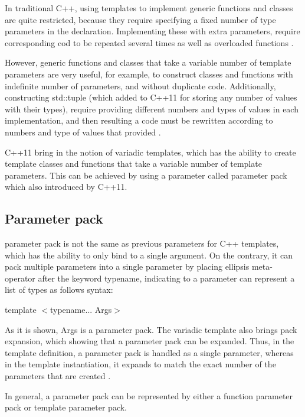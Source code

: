 \documentclass[11pt]{report}
\begin{document}
In traditional C++, using templates to implement generic functions and classes are quite restricted, because they require specifying a fixed number of type parameters in the declaration. Implementing these with extra parameters, require corresponding cod to be repeated several times as well as overloaded functions \cite{Stroustrup:2012:Cpp11}.


However, generic functions and classes that take a variable number of template parameters are very useful, for example, to construct classes and functions with indefinite number of parameters, and without duplicate code. Additionally, constructing std::tuple (which added to C++11 for storing any number of values with their types), require providing different numbers and types of values in each implementation, and then resulting a code must be rewritten according to numbers and type of values that provided \cite{Stroustrup:2012:Cpp11}.


C++11 bring in the notion of variadic templates, which has the ability to create template classes and functions that take a variable number of template parameters. This can be achieved by using a parameter called parameter pack which also introduced by C++11.


\subsection{Parameter pack}
\label{subsection: Parameter pack}
parameter pack is not the same as previous parameters for C++ templates, which has the ability to only bind to a single argument. On the contrary, it can pack multiple parameters into a single parameter by placing ellipsis meta-operator after the keyword typename, indicating to a parameter can represent a list of types as follows syntax:
\begin{center}
template $<$typename... Args$>$
\end{center}

As it is shown, Args is a parameter pack. The variadic template also brings pack expansion, which showing that a parameter pack can be expanded. Thus, in the template definition, a parameter pack is handled as a single parameter, whereas in the template instantiation, it expands to match the exact number of the parameters that are created \cite{Gregorie:professionalcpp}.


In general, a parameter pack can be represented by either a function parameter pack or template parameter pack.
\end{document}
